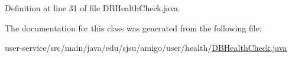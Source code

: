 Definition at line 31 of file D\+B\+Health\+Check.\+java.



The documentation for this class was generated from the following file\+:\begin{DoxyCompactItemize}
\item 
user-\/service/src/main/java/edu/sjsu/amigo/user/health/\hyperlink{_d_b_health_check_8java}{D\+B\+Health\+Check.\+java}\end{DoxyCompactItemize}
